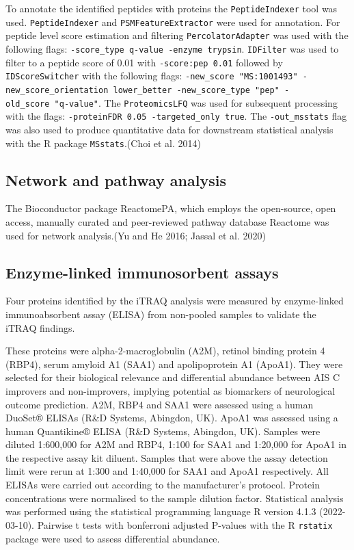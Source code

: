 \documentclass[
]{article}
\begin{document}
To annotate the identified peptides with proteins the \texttt{PeptideIndexer} tool was used.
\texttt{PeptideIndexer} and \texttt{PSMFeatureExtractor} were used for annotation.
For peptide level score estimation and filtering \texttt{PercolatorAdapter} was used with the following flags: \texttt{-score\_type\ q-value\ -enzyme\ trypsin}.
\texttt{IDFilter} was used to filter to a peptide score of 0.01 with \texttt{-score:pep\ 0.01} followed by \texttt{IDScoreSwitcher} with the following flags: \texttt{-new\_score\ "MS:1001493"\ -new\_score\_orientation\ lower\_better\ -new\_score\_type\ "pep"\ -old\_score\ "q-value"}.
The \texttt{ProteomicsLFQ} was used for subsequent processing with the flags: \texttt{-proteinFDR\ 0.05\ -targeted\_only\ true}.
The \texttt{-out\_msstats} flag was also used to produce quantitative data for downstream statistical analysis with the R package \texttt{MSstats}.(Choi et al. 2014)

\hypertarget{pathway-analysis-chap3}{%
\subsection{Network and pathway analysis}\label{pathway-analysis-chap3}}

The Bioconductor package ReactomePA, which employs the open-source, open access, manually curated and peer-reviewed pathway database Reactome was used for network analysis.(Yu and He 2016; Jassal et al. 2020)

\hypertarget{enzyme-linked-immunosorbent-assays}{%
\subsection{Enzyme-linked immunosorbent assays}\label{enzyme-linked-immunosorbent-assays}}

Four proteins identified by the iTRAQ analysis were measured by enzyme-linked immunoabsorbent assay (ELISA) from non-pooled samples to validate the iTRAQ findings.

These proteins were alpha-2-macroglobulin (A2M), retinol binding protein 4 (RBP4), serum amyloid A1 (SAA1) and apolipoprotein A1 (ApoA1).
They were selected for their biological relevance and differential abundance between AIS C improvers and non-improvers, implying potential as biomarkers of neurological outcome prediction.
A2M, RBP4 and SAA1 were assessed using a human DuoSet® ELISAs (R\&D Systems, Abingdon, UK).
ApoA1 was assessed using a human Quantikine® ELISA (R\&D Systems, Abingdon, UK).
Samples were diluted 1:600,000 for A2M and RBP4, 1:100 for SAA1 and 1:20,000 for ApoA1 in the respective assay kit diluent.
Samples that were above the assay detection limit were rerun at 1:300 and 1:40,000 for SAA1 and ApoA1 respectively.
All ELISAs were carried out according to the manufacturer's protocol.
Protein concentrations were normalised to the sample dilution factor.
Statistical analysis was performed using the statistical programming language R version 4.1.3 (2022-03-10).
Pairwise t tests with bonferroni adjusted P-values with the R \texttt{rstatix} package were used to assess differential abundance.
\end{document}

